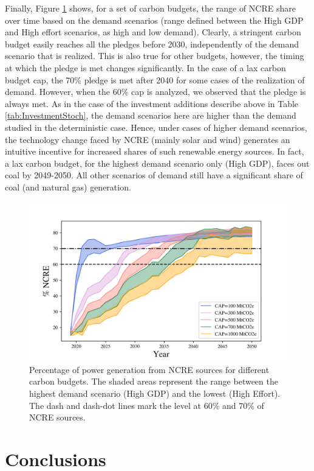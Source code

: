\documentclass[11pt, letterpaper]{article}
\begin{document}
Finally, Figure \ref{fig:ernc_percent_shadows} shows, for a set of carbon budgets, the range of NCRE share over time based on the demand scenarios (range defined between the High GDP and High effort scenarios, as high and low demand). Clearly, a stringent carbon budget easily reaches all the pledges before 2030, independently of the demand scenario that is realized. This is also true for other budgets, however, the timing at which the pledge is met changes significantly. In the case of a lax carbon budget cap, the 70\% pledge is met after 2040 for some cases of the realization of demand. However, when the 60\% cap is analyzed, we observed that the pledge is always met. As in the case of the investment additions describe above in Table \ref{tab:InvestmentStoch}, the demand scenarios here are higher than the demand studied in the deterministic case. Hence, under cases of higher demand scenarios, the technology change faced by NCRE (mainly solar and wind) generates an intuitive incentive for increased shares of such renewable energy sources. In fact, a lax carbon budget, for the highest demand scenario only (High GDP), faces out coal by 2049-2050. All other scenarios of demand still have a significant share of coal (and natural gas) generation. 

\begin{figure}[ht!]
\centering
 \includegraphics[width=4.5in]{Figures/ernc_percent_shadows.png}
 \caption{Percentage of power generation from NCRE sources for different carbon budgets. The shaded areas represent the range between the highest demand scenario (High GDP) and the lowest (High Effort). The dash and dash-dot lines mark the level at 60\% and 70\% of NCRE sources.}
  \label{fig:ernc_percent_shadows}
  \end{figure}

\section{Conclusions}\label{sec:concl}
\end{document}
